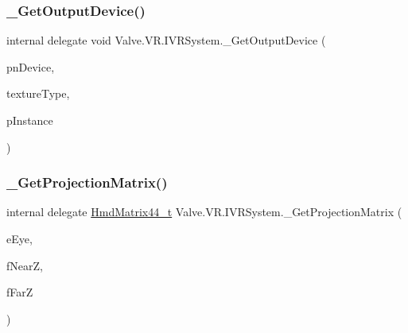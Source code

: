 \mbox{\label{struct_valve_1_1_v_r_1_1_i_v_r_system_a7b0363d609497bbe2b11d2af5ff2fc07}} 
\subsubsection{\texorpdfstring{\_GetOutputDevice()}{\_GetOutputDevice()}}
{\footnotesize\ttfamily internal delegate void Valve.\+V\+R.\+I\+V\+R\+System.\+\_\+\+Get\+Output\+Device (\begin{DoxyParamCaption}\item[{ref ulong}]{pn\+Device,  }\item[{\mbox{\hyperlink{namespace_valve_1_1_v_r_a9481de640e411eef49c2f3fdca82eaa3}{E\+Texture\+Type}}}]{texture\+Type,  }\item[{Int\+Ptr}]{p\+Instance }\end{DoxyParamCaption})}

\mbox{\label{struct_valve_1_1_v_r_1_1_i_v_r_system_a10aad034ee13b75116d84a989eced445}} 
\subsubsection{\texorpdfstring{\_GetProjectionMatrix()}{\_GetProjectionMatrix()}}
{\footnotesize\ttfamily internal delegate \mbox{\hyperlink{struct_valve_1_1_v_r_1_1_hmd_matrix44__t}{Hmd\+Matrix44\+\_\+t}} Valve.\+V\+R.\+I\+V\+R\+System.\+\_\+\+Get\+Projection\+Matrix (\begin{DoxyParamCaption}\item[{\mbox{\hyperlink{namespace_valve_1_1_v_r_a8153d4a3e627e1cede046327087c1880}{E\+V\+R\+Eye}}}]{e\+Eye,  }\item[{float}]{f\+NearZ,  }\item[{float}]{f\+FarZ }\end{DoxyParamCaption})}

\mbox{\label{struct_valve_1_1_v_r_1_1_i_v_r_system_adb042a1d95520b0ab26f1f2c97d7dff4}} 
